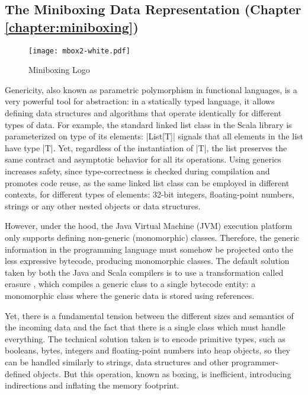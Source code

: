 \subsection{The Miniboxing Data Representation (Chapter \ref{chapter:miniboxing})}

\begin{wrapfigure}{r}{50mm}
  \centering
  \vspace{-3em}
  \texttt{[image: mbox2-white.pdf]}
  \vspace{-3em}
  \caption{Miniboxing Logo}
\end{wrapfigure}

Genericity, also known as parametric polymorphism in functional languages, is a very powerful tool for abstraction: in a statically typed language, it allows defining data structures and algorithms that operate identically for different types of data. For example, the standard linked list class in the Scala library is parameterized on type of its elements: |List[T]| signals that all elements in the list have type |T|. Yet, regardless of the instantiation of |T|, the list preserves the same contract and asymptotic behavior for all its operations. Using generics increases safety, since type-correctness is checked during compilation and promotes code reuse, as the same linked list class can be employed in different contexts, for different types of elements: 32-bit integers, floating-point numbers, strings or any other nested objects or data structures.

However, under the hood, the Java Virtual Machine (JVM) execution platform only supports defining non-generic (monomorphic) classes. Therefore, the generic information in the programming language must somehow be projected onto the less expressive bytecode, producing monomorphic classes. The default solution taken by both the Java and Scala compilers is to use a transformation called erasure \cite{java-erasure}, which compiles a generic class to a single bytecode entity: a monomorphic class where the generic data is stored using references.

Yet, there is a fundamental tension between the different sizes and semantics of the incoming data and the fact that there is a single class which must handle everything. The technical solution taken is to encode primitive types, such as booleans, bytes, integers and floating-point numbers into heap objects, so they can be handled similarly to strings, data structures and other programmer-defined objects. But this operation, known as boxing, is inefficient, introducing indirections and inflating the memory footprint.

